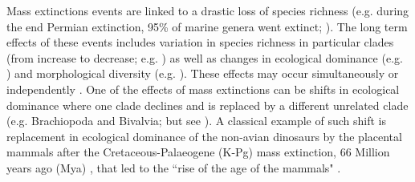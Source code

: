 \documentclass[12pt,letterpaper]{article}
\begin{document}
Mass extinctions events are linked to a drastic loss of species richness (e.g. during the end Permian extinction, 95\% of marine genera went extinct; \cite{RaupPT,BentonPT}). The long term effects of these events includes variation in species richness in particular clades (from increase to decrease; e.g. \cite{Benton85,Erwin1998344,fritzdiversity2013}) as well as changes in ecological dominance (e.g. \cite{Brusatte12092008,toljagictriassic-jurassic2013,bensonfaunal2014}) and morphological diversity (e.g. \cite{friedmanexplosive2010,brusattedinosaur2012}). These effects may occur simultaneously or independently \cite{slaterCetacean,ruta2013,hopkinsdecoupling2013}. One of the effects of mass extinctions can be shifts in ecological dominance where one clade declines and is replaced by a different unrelated clade (e.g. Brachiopoda and Bivalvia; \cite{Sepkiski1981,CLAPHAM01102006} but see \cite{Payne22052014}). A classical example of such shift is replacement in ecological dominance of the non-avian dinosaurs by the placental mammals after the Cretaceous-Palaeogene (K-Pg) mass extinction, 66 Million years ago (Mya) \cite{rennetime2013}, that led to the ``rise of the age of the mammals" \cite{archibald2011extinction,Lovergrove}.
\end{document}

